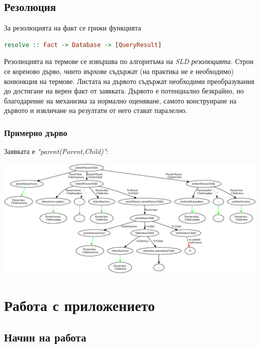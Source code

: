 \documentclass[15pt]{extarticle}
\begin{document}
	\begin{landscape}
	
	\subsection{Резолюция}
	
	За резолюцията на факт се грижи функцията
	
	\begin{lstlisting}[language=haskell]
		resolve :: Fact -> Database -> [QueryResult]
	\end{lstlisting}
	
	Резолюцията на термове се извършва по алгоритъма на \emph{SLD резолюцията}. Строи се кореново дърво, чиито върхове съдържат (на практика не е необходимо) конюнкция на термове. Листата на дървото съдържат необходими преобразувания до достигане на верен факт от заявката. Дървото е потенциално безкрайно, но благодарение на механизма за нормално оценяване, самото конструиране на дървото и извличане на резултати от него стават паралелно.

	\subsubsection{Примерно дърво}
	
	 Заявката е \emph{"parent(Parent,Child)"}:
	
	\begin{center}
		\includegraphics[scale=.58]{assets/rTree.eps}
	\end{center}
	
	\end{landscape}
	
	\section{Работа с приложението}
	
	\subsection{Начин на работа}
	
\end{document}

